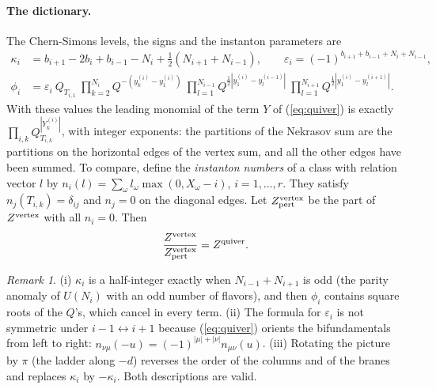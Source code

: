\documentclass[11pt]{article}
\theoremstyle{plain}
\theoremstyle{definition}
\theoremstyle{remark}
\newtheorem{remark}[theorem]{Remark}
\begin{document}
\paragraph{The dictionary.} The Chern-Simons levels, the signs and the instanton parameters are
\begin{align}
\kappa_i&=b_{i+1}-2b_i+b_{i-1}-N_i+\tfrac12(N_{i+1}+N_{i-1}),\qquad
\varepsilon_i=(-1)^{b_{i+1}+b_{i-1}+N_i+N_{i-1}},\\
\phi_i&=\varepsilon_i\ Q_{T_{i,1}}\ \prod_{k=2}^{N_i}Q^{-(y^{(i)}_k-y^{(i)}_1)}\
\prod_{l=1}^{N_{i-1}}Q^{\frac12|y^{(i)}_1-y^{(i-1)}_l|}\ \prod_{l=1}^{N_{i+1}}Q^{\frac12|y^{(i)}_1-y^{(i+1)}_l|}.\label{eq:phi}
\end{align}
With these values the leading monomial of the term $Y$ of (\ref{eq:quiver}) is exactly
$\prod_{i,k}Q_{T_{i,k}}^{|Y^{(i)}_k|}$, with integer exponents: the partitions of the Nekrasov
sum are the partitions on the horizontal edges of the vertex sum, and all the other edges have
been summed. To compare, define the \textit{instanton numbers} of a class with relation vector $l$
by $n_i(l)=\sum_\omega l_\omega\max(0,X_\omega-i)$, $i=1,\ldots,r$. They satisfy
$n_j(T_{i,k})=\delta_{ij}$ and $n_j=0$ on the diagonal edges. Let
$Z^{\rm vertex}_{\rm pert}$ be the part of
$Z^{\rm vertex}$ with all $n_i=0$. Then
\begin{equation}
\frac{Z^{\rm vertex}}{Z^{\rm vertex}_{\rm pert}}=Z^{\rm quiver}.
\end{equation}

\begin{remark}
(i) $\kappa_i$ is a half-integer exactly when $N_{i-1}+N_{i+1}$ is odd (the parity anomaly of
$U(N_i)$ with an odd number of flavors), and then $\phi_i$ contains square roots of the
$Q$'s, which cancel in every term. (ii) The formula for $\varepsilon_i$ is not symmetric under
$i-1\leftrightarrow i+1$ because (\ref{eq:quiver}) orients the bifundamentals from left to
right: $n_{\nu\mu}(-u)=(-1)^{|\mu|+|\nu|}n_{\mu\nu}(u)$. (iii) Rotating the picture by $\pi$
(the ladder along $-d$) reverses the order of the columns and of the branes and replaces
$\kappa_i$ by $-\kappa_i$. Both descriptions are valid.
\end{remark}
\end{document}
